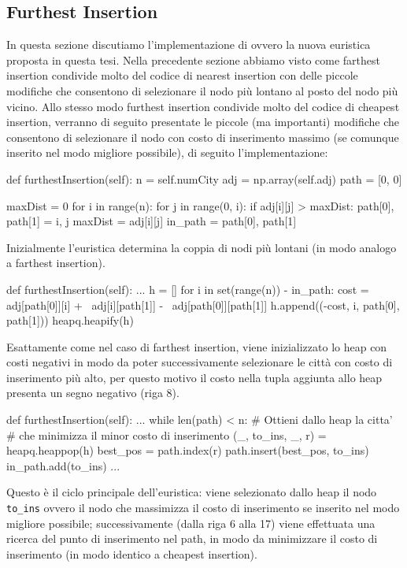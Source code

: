 \documentclass[a4paper,12pt]{report}
\begin{document}
\subsection{Furthest Insertion}
In questa sezione discutiamo l'implementazione di  ovvero la nuova euristica proposta in questa tesi. Nella precedente sezione abbiamo visto come farthest insertion condivide molto del codice di nearest insertion con delle piccole modifiche che consentono di selezionare il nodo più lontano al posto del nodo più vicino. Allo stesso modo furthest insertion condivide molto del codice di cheapest insertion, verranno di seguito presentate le piccole (ma importanti) modifiche che consentono di selezionare il nodo con costo di inserimento massimo (se comunque inserito nel modo migliore possibile), di seguito l'implementazione:
\begin{python}
def furthestInsertion(self):
  n = self.numCity
  adj = np.array(self.adj)
  path = [0, 0]

  maxDist = 0
  for i in range(n):
      for j in range(0, i):
          if adj[i][j] > maxDist:
              path[0], path[1] = i, j
              maxDist = adj[i][j]
  in_path = {path[0], path[1]}
\end{python}
Inizialmente l'euristica determina la coppia di nodi più lontani (in modo analogo a farthest insertion).
\begin{python}
def furthestInsertion(self):
  ...
  h = []
  for i in set(range(n)) - in_path:
    cost = adj[path[0]][i] + \
           adj[i][path[1]] - \
           adj[path[0]][path[1]]
    h.append((-cost, i, path[0], path[1]))
  heapq.heapify(h)
\end{python}
Esattamente come nel caso di farthest insertion, viene inizializzato lo heap con costi negativi in modo da poter successivamente selezionare le città con costo di inserimento più alto, per questo motivo il costo nella tupla aggiunta allo heap presenta un segno negativo (riga 8). \newline
\begin{python}
def furthestInsertion(self):
  ...
  while len(path) < n:
    # Ottieni dallo heap la citta' 
    # che minimizza il minor costo di inserimento
    (_, to_ins, _, r) = heapq.heappop(h)
    best_pos = path.index(r)
    path.insert(best_pos, to_ins)
    in_path.add(to_ins)
    ...
\end{python}
Questo è il ciclo principale dell'euristica: viene selezionato dallo heap il nodo \lstinline!to_ins! ovvero il nodo che massimizza il costo di inserimento se inserito nel modo migliore possibile; successivamente (dalla riga 6 alla 17) viene effettuata una ricerca del punto di inserimento nel path, in modo da minimizzare il costo di inserimento (in modo identico a cheapest insertion).
\end{document}

